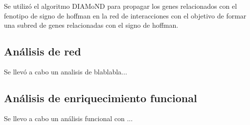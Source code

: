 Se utilizó el algoritmo DIAMoND para propagar los genes relacionados con el fenotipo de signo de hoffman en la red de interacciones con el objetivo de formar una subred de genes relacionadas con el signo de hoffman.

\subsection{Análisis de red}

Se llevó a cabo un analisis de blablabla...
\subsection{Análisis de enriquecimiento funcional}

Se llevo a cabo un análisis funcional con ... 
